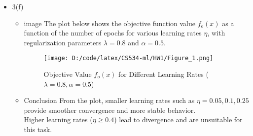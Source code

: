 \documentclass[10pt,letterpaper]{article}
\begin{document}
\begin{itemize}
\begin{itemize}
        \end{itemize}
    \newpage    
    \item {3(f)}
        \begin{itemize}
            \item {image}
                The plot below shows the objective function value \( f_o(x) \) as a function of the number of epochs for various learning rates \( \eta \), with regularization parameters \( \lambda = 0.8 \) and \( \alpha = 0.5 \).

                \begin{figure}[H]
                    \centering
                    \texttt{[image: D:/code/latex/CS534-ml/HW1/Figure\_1.png]}
                    \caption{Objective Value \( f_o(x) \) for Different Learning Rates (\( \lambda = 0.8, \alpha = 0.5 \))}
                \end{figure}
            
            \item {Conclusion}
            From the plot, smaller learning rates such as \( \eta = 0.05, 0.1, 0.25 \) provide smoother convergence and more stable behavior. \\
            Higher learning rates (\( \eta \geq 0.4 \)) lead to divergence and are unsuitable for this task.
        \end{itemize}
    

\end{itemize}
\end{document}
